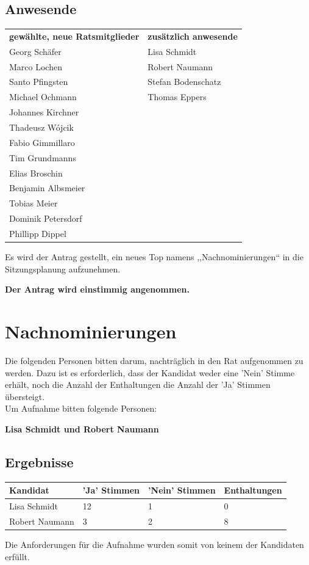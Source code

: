 \documentclass[a4paper, 11pt]{article} %
\begin{document}
\subsection{Anwesende}
\begin{tabular}{ll}
	\textbf{gewählte, neue Ratsmitglieder} & \textbf{zusätzlich anwesende}\\
	Georg Schäfer & Lisa Schmidt\\
	Marco Lochen & Robert Naumann\\
	Santo Pfingsten & Stefan Bodenschatz\\
	Michael Ochmann & Thomas Eppers\\
	Johannes Kirchner & \\
	Thadeusz W{\'o}jcik & \\
	Fabio Gimmillaro & \\
	Tim Grundmanns & \\
	Elias Broschin & \\
	Benjamin Albsmeier & \\
	Tobias Meier & \\
	Dominik Petersdorf & \\
	Phillipp Dippel & \\
\end{tabular}
\vspace{1.0cm}
\begin{flushleft}
Es wird der Antrag gestellt, ein neues Top namens ,,Nachnominierungen`` in die Sitzungsplanung aufzunehmen.
\begin{center}
	\textbf{Der Antrag wird einstimmig angenommen.}
\end{center}
\end{flushleft}

\section{Nachnominierungen}
Die folgenden Personen bitten darum, nachträglich in den Rat aufgenommen zu werden. Dazu ist es erforderlich, dass der Kandidat weder eine 'Nein' Stimme erhält, noch die Anzahl der Enthaltungen die Anzahl der 'Ja' Stimmen übersteigt.\\
Um Aufnahme bitten folgende Personen:
\begin{flushleft}
	\textbf{Lisa Schmidt und Robert Naumann}
\end{flushleft}
\subsection{Ergebnisse}
\begin{tabular}{|l|l|l|l|}
	\hline
	\textbf{Kandidat} & \textbf{'Ja' Stimmen} & \textbf{'Nein' Stimmen} & \textbf{Enthaltungen}\\ \hline
	Lisa Schmidt & 12 & 1 & 0\\ \hline
	Robert Naumann & 3 & 2 & 8\\ \hline
\end{tabular}
\vspace{0.5cm}
\begin{flushleft}
	Die Anforderungen für die Aufnahme wurden somit von keinem der Kandidaten erfüllt.
\end{flushleft}
\end{document}
